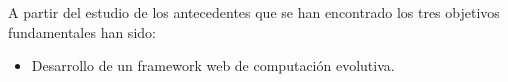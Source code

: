 


A partir del estudio de los antecedentes que se han encontrado los tres objetivos fundamentales 
han sido:

\begin{itemize}
    \item Desarrollo de un framework web de computación evolutiva.
\end{itemize}